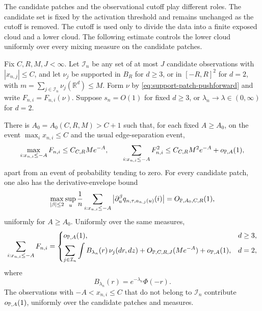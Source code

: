The candidate patches and the observational cutoff play different roles.  The
candidate set is fixed by the activation threshold and remains unchanged as
the cutoff is removed.  The cutoff is used only to divide the data into a
finite exposed cloud and a lower cloud.  The following estimate controls the
lower cloud uniformly over every mixing measure on the candidate patches.
\begin{lemma}
\label{lem:support-uniform-lower-cloud}
Fix \(C,R,M,J<\infty\).  Let \(\mathcal I_n\) be any set of at most \(J\)
candidate observations with \(|x_{n,j}|\le C\), and let \(\nu_j\) be supported
in \(B_R\) for \(d\ge3\), or in \([-R,R]^2\) for \(d=2\), with
\(m=\sum_{j\in\mathcal I_n}\nu_j(\mathbb R^d)\le M\).  Form \(\nu\) by
\eqref{eq:support-patch-pushforward} and write
\(F_{n,i}=F_{n,i}(\nu)\).  Suppose \(s_n=O(1)\) for fixed \(d\ge3\), or
\(\lambda_n\to\lambda\in(0,\infty)\) for \(d=2\).

There is \(A_0=A_0(C,R,M)>C+1\) such that, for each fixed
\(A\ge A_0\), on the event \(\max_i x_{n,i}\le C\) and the usual
edge-separation event,
\begin{equation}
\label{eq:support-lower-cloud-max-square}
 \max_{i:x_{n,i}\le-A}F_{n,i}\le C_{C,R}Me^{-A},
 \qquad
 \sum_{i:x_{n,i}\le-A}F_{n,i}^2
 \le C_{C,R}M^2e^{-A}+o_{\mathbb P,A}(1),
\end{equation}
apart from an event of probability tending to zero.  For every candidate
patch, one also has the derivative-envelope bound
\begin{equation}
\label{eq:support-lower-cloud-derivative-envelope}
 \max_{|\beta|\le2}\sup_u
 \frac1n\sum_{i:x_{n,i}\le-A}
 \left|\partial_u^\beta
 q_{n,\tau,a_{n,j}(u)}(i)\right|
 =O_{\mathbb P,A_0,C,R}(1),
\end{equation}
uniformly for \(A\ge A_0\).
Uniformly over the same measures,
\begin{equation}
\label{eq:support-lower-cloud-linear}
 \sum_{i:x_{n,i}\le-A}F_{n,i}
 =
 \begin{cases}
   o_{\mathbb P,A}(1),&d\ge3,\\[1mm]
   \displaystyle
   \sum_{j\in\mathcal I_n}\int B_{\lambda_n}(r)\,\nu_j(dr,dz)
      +O_{\mathbb P,C,R,J}(Me^{-A})+o_{\mathbb P,A}(1),&d=2,
 \end{cases}
\end{equation}
where
\[
 B_{\lambda_n}(r)=e^{-\lambda_n}\Phi(-r).
\]
The observations with \(-A<x_{n,i}\le C\) that do not belong to
\(\mathcal I_n\) contribute \(o_{\mathbb P,A}(1)\), uniformly over the candidate
patches and measures.
\end{lemma}

